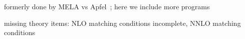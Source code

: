 formerly done by MELA vs Apfel~\cite{Bertone:2015cwa}; here we include more programs

missing theory items: NLO matching conditions incomplete, NNLO matching conditions
